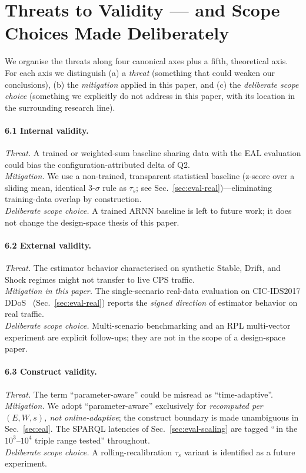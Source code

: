 \documentclass[runningheads]{llncs}
\newcommand{\taus}{\ensuremath{\tau_{s}}}
\begin{document}
\section{Threats to Validity --- and Scope Choices Made Deliberately}
\label{sec:tov}

We organise the threats along four canonical axes plus a fifth,
theoretical axis. For each axis we distinguish (a) a \emph{threat}
(something that could weaken our conclusions), (b) the \emph{mitigation}
applied in this paper, and (c) the \emph{deliberate scope choice}
(something we explicitly do not address in this paper, with its location
in the surrounding research line).

\paragraph{6.1 Internal validity.}
\emph{Threat.} A trained or weighted-sum baseline sharing data with the
EAL evaluation could bias the configuration-attributed delta of Q2.\\
\emph{Mitigation.} We use a non-trained, transparent statistical
baseline (z-score over a sliding mean, identical 3-$\sigma$ rule as
$\taus$; see Sec.~\ref{sec:eval-real})---eliminating training-data
overlap by construction.\\
\emph{Deliberate scope choice.} A trained ARNN baseline is left to
future work; it does not change the design-space thesis of this paper.

\paragraph{6.2 External validity.}
\emph{Threat.} The estimator behavior characterised on synthetic Stable,
Drift, and Shock regimes might not transfer to live CPS traffic.\\
\emph{Mitigation in this paper.} The single-scenario real-data
evaluation on CIC-IDS2017 DDoS~\cite{cicids2017}
(Sec.~\ref{sec:eval-real}) reports the \emph{signed direction} of
estimator behavior on real traffic.\\
\emph{Deliberate scope choice.} Multi-scenario benchmarking and an RPL
multi-vector experiment are explicit follow-ups; they are not in the
scope of a design-space paper.

\paragraph{6.3 Construct validity.}
\emph{Threat.} The term ``parameter-aware'' could be misread as
``time-adaptive''.\\
\emph{Mitigation.} We adopt ``parameter-aware'' exclusively for
\emph{recomputed per $(E, W, s)$, not online-adaptive}; the construct
boundary is made unambiguous in Sec.~\ref{sec:eal}. The SPARQL latencies
of Sec.~\ref{sec:eval-scaling} are tagged ``\,in the
$10^{3}$--$10^{4}$ triple range tested'' throughout.\\
\emph{Deliberate scope choice.} A rolling-recalibration $\taus$ variant
is identified as a future experiment.
\end{document}
